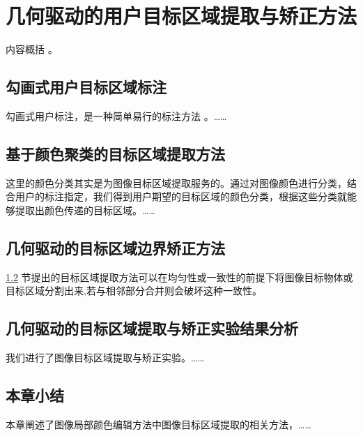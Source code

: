 \chapter{几何驱动的用户目标区域提取与矫正方法}
内容概括 \cite{zhang98}。

\section{勾画式用户目标区域标注}
勾画式用户标注，是一种简单易行的标注方法\cite{hariharan14,Li08,Su81,Liu93,jiang99} 。……

\section{基于颜色聚类的目标区域提取方法}
\label{sec1}
这里的颜色分类其实是为图像目标区域提取服务的。通过对图像颜色进行分类，结合用户的标注指定，我们得到用户期望的目标区域的颜色分类，根据这些分类就能够提取出颜色传递的目标区域。……

\section{几何驱动的目标区域边界矫正方法}
\ref{sec1} 节提出的目标区域提取方法可以在均匀性或一致性的前提下将图像目标物体或目标区域分割出来,若与相邻部分合并则会破坏这种一致性。

\section{几何驱动的目标区域提取与矫正实验结果分析}
我们进行了图像目标区域提取与矫正实验。……

\section{本章小结}
本章阐述了图像局部颜色编辑方法中图像目标区域提取的相关方法，……

